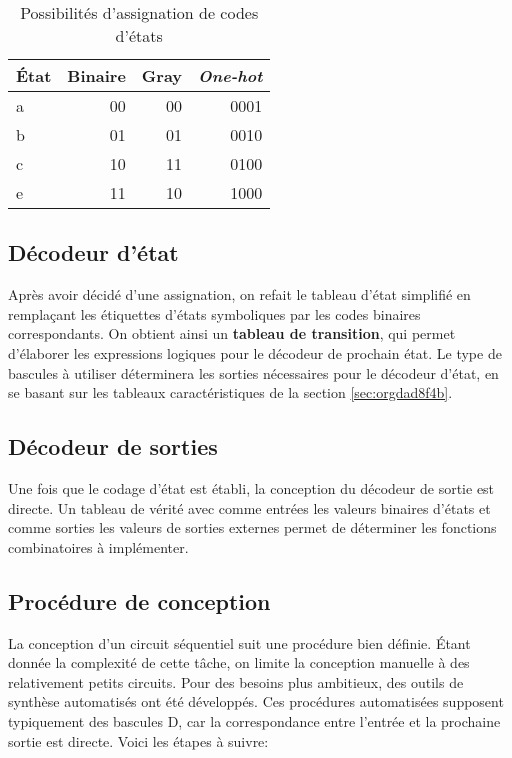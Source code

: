 \documentclass[11pt]{article}
\begin{document}
\begin{table}[htbp]
\caption{\label{tab:org26d488e}Possibilités d'assignation de codes d'états}
\centering
\begin{tabular}{lrrr}
État & Binaire & Gray & \emph{One-hot}\\
\hline
a & 00 & 00 & 0001\\
b & 01 & 01 & 0010\\
c & 10 & 11 & 0100\\
e & 11 & 10 & 1000\\
\end{tabular}
\end{table}

\subsection{Décodeur d'état}
\label{sec:org1266ead}

Après avoir décidé d'une assignation, on refait le tableau d'état
simplifié en remplaçant les étiquettes d'états symboliques par les
codes binaires correspondants. On obtient ainsi un \textbf{tableau de
transition}, qui permet d'élaborer les expressions logiques pour le
décodeur de prochain état. Le type de bascules à utiliser déterminera
les sorties nécessaires pour le décodeur d'état, en se basant sur les
tableaux caractéristiques de la section \ref{sec:orgdad8f4b}.

\subsection{Décodeur de sorties}
\label{sec:org8311ae6}

Une fois que le codage d'état est établi, la conception du décodeur de
sortie est directe. Un tableau de vérité avec comme entrées les
valeurs binaires d'états et comme sorties les valeurs de sorties
externes permet de déterminer les fonctions combinatoires à
implémenter.

\subsection{Procédure de conception}
\label{sec:orga07701c}

La conception d'un circuit séquentiel suit une procédure bien
définie. Étant donnée la complexité de cette tâche, on limite la
conception manuelle à des relativement petits circuits. Pour des
besoins plus ambitieux, des outils de synthèse automatisés ont été
développés. Ces procédures automatisées supposent typiquement des
bascules D, car la correspondance entre l'entrée et la prochaine
sortie est directe. Voici les étapes à suivre:
\end{document}
